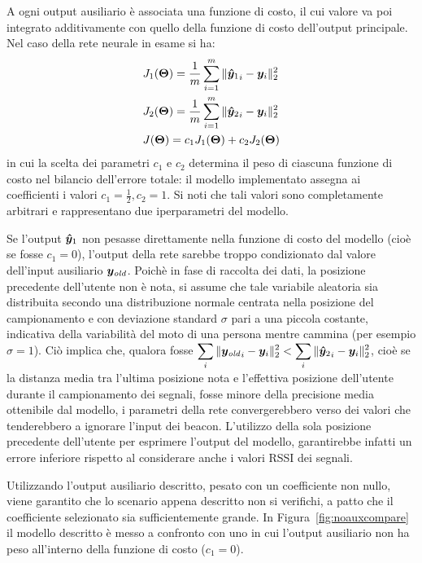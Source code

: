 A ogni output ausiliario è associata una funzione di costo, il cui valore va
poi integrato additivamente con quello della funzione di costo dell'output
principale. Nel caso della rete neurale in esame si ha:
\begin{align*}
  &J_1(\bm \Theta) =  \frac{1}{m} \sum_{i=1}^m{\| {{}\bm\hat{\bm y}_1}_{i} - \bm y_i\|^2_2} \\
  &J_2(\bm \Theta) =  \frac{1}{m} \sum_{i=1}^m{\| {{}\bm\hat{\bm y}_2}_{i} - \bm y_i\|^2_2} \\
  &J(\bm \Theta) = c_1 J_1(\bm \Theta) + c_2 J_2(\bm \Theta)
\end{align*}
in cui la scelta dei parametri \(c_1\) e \(c_2\) determina il peso di ciascuna
funzione di costo nel bilancio dell'errore totale: il modello implementato
assegna ai coefficienti i valori \( c_1 = \frac{1}{2}, c_2 = 1 \). Si noti che
tali valori sono completamente arbitrari e rappresentano due iperparametri del
modello.

Se l'output \(\bm\hat{\bm y}_1\) non pesasse direttamente nella funzione di costo
del modello (cioè se fosse \(c_1 = 0\)), l'output della rete sarebbe troppo
condizionato dal valore dell'input ausiliario \(\bm y_{\mathit{old}}\). Poichè in fase di
raccolta dei dati, la posizione precedente dell'utente non è nota, si assume
che tale variabile aleatoria sia distribuita secondo una distribuzione normale
centrata nella posizione del campionamento e con deviazione standard \(\sigma\)
pari a una piccola costante, indicativa della variabilità del moto di una
persona mentre cammina (per esempio \( \sigma = 1 \)). Ciò implica che, qualora
fosse \(\displaystyle \sum_i\| {\bm y_{\mathit{old}}}_i - \bm y_i \|^2_2 < \sum_i \|
  {{}\bm\hat{\bm y}_2}_{i} - \bm y_i\|^2_2 \), cioè se la distanza media tra l'ultima
posizione nota e l'effettiva posizione dell'utente durante il campionamento dei
segnali, fosse minore della precisione media ottenibile dal modello, i
parametri della rete convergerebbero verso dei valori che tenderebbero a
ignorare l'input dei beacon. L'utilizzo della sola posizione precedente
dell'utente per esprimere l'output del modello, garantirebbe infatti un errore
inferiore rispetto al considerare anche i valori RSSI dei segnali.

Utilizzando l'output ausiliario descritto, pesato con un coefficiente non
nullo, viene garantito che lo scenario appena descritto non si verifichi, a
patto che il coefficiente selezionato sia sufficientemente grande. In
Figura~\ref{fig:noauxcompare} il modello descritto è messo a confronto con uno
in cui l'output ausiliario non ha peso all'interno della funzione di costo
(\(c_1 = 0\)).

